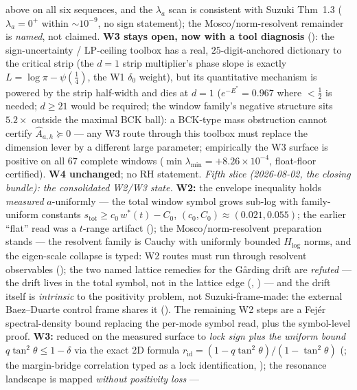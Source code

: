 above on all six sequences, and the $\lambda_a$ scan is consistent
with Suzuki Thm~1.3 ($\lambda_a=0^+$ within ${\sim}10^{-9}$, no sign
statement); the Mosco/norm-resolvent remainder is \emph{named}, not
claimed.  \textbf{W3 stays open, now with a tool diagnosis}
(): the sign-uncertainty /
LP-ceiling toolbox has a real, $25$-digit-anchored dictionary to the
critical strip (the $d=1$ strip multiplier's phase slope is exactly
$L=\log\pi-\psi(\tfrac14)$, the W1 $\delta_0$ weight), but its
quantitative mechanism is powered by the strip half-width and dies at
$d=1$ ($e^{-E^*}=0.967$ where $<\tfrac12$ is needed; $d\ge21$ would be
required; the window family's negative structure sits $5.2\times$
outside the maximal BCK ball): a BCK-type mass obstruction cannot
certify $\widehat A_{a,h}\succeq0$ --- any W3 route through this
toolbox must replace the dimension lever by a different large
parameter; empirically the W3 surface is positive on all $67$
complete windows ($\min\lambda_{\min}=+8.26\times10^{-4}$, float-floor
certified).  \textbf{W4 unchanged}; no RH statement.
\emph{Fifth slice (2026-08-02, the closing bundle): the consolidated
W2/W3 state.}  \textbf{W2:} the envelope inequality holds
\emph{measured} $a$-uniformly --- the total window symbol grows
sub-log with family-uniform constants
$s_{\mathrm{tot}}\ge c_0\,w^*(t)-C_0$, $(c_0,C_0)\approx(0.021,
0.055)$; the earlier ``flat'' read was a $t$-range artifact
(); the Mosco/norm-resolvent
preparation stands --- the resolvent family is Cauchy with uniformly
bounded $H_{\log}$ norms, and the eigen-scale collapse is typed: W2
routes must run through resolvent observables
(); the two named lattice remedies for the
G\aa rding drift are \emph{refuted} --- the drift lives in the total
symbol, not in the lattice edge (,
) --- and the drift itself is
\emph{intrinsic} to the positivity problem, not Suzuki-frame-made:
the external Baez--Duarte control frame shares it
().  The remaining W2 steps are a
Fej\'er spectral-density bound replacing the per-mode symbol read,
plus the symbol-level proof.  \textbf{W3:} reduced on the measured
surface to \emph{lock sign plus the uniform bound}
$q\tan^2\theta\le1-\delta$ via the exact 2D formula
$r_{\mathrm{id}}=(1-q\tan^2\theta)/(1-\tan^2\theta)$
(; the margin-bridge correlation typed
as a lock identification, ); the
resonance landscape is mapped \emph{without positivity loss} ---
